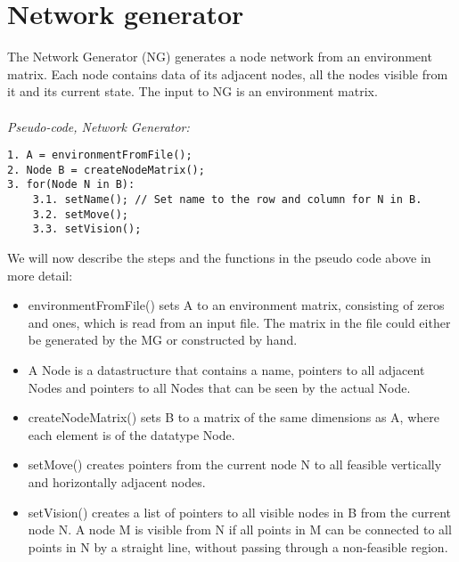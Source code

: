 \section{Network generator}
The Network Generator (NG) generates a node network from an environment matrix. Each node contains data of its adjacent nodes, all the nodes visible from it and its current state. The input to NG is an environment matrix.\\
\\
\noindent \emph{Pseudo-code, Network Generator:}
\begin{verbatim}
1. A = environmentFromFile();
2. Node B = createNodeMatrix();
3. for(Node N in B):
    3.1. setName(); // Set name to the row and column for N in B.
    3.2. setMove();
    3.3. setVision();
\end{verbatim}
We will now describe the steps and the functions in the pseudo code above in more detail:
\begin{itemize}
\item environmentFromFile() sets A to an environment matrix, consisting of zeros and ones, which is read from an input file. The matrix in the file could either be generated by the MG or constructed by hand.
\item A Node is a datastructure that contains a name, pointers to all adjacent Nodes and pointers to all Nodes that can be seen by the actual Node.
\item createNodeMatrix() sets B to a matrix of the same dimensions as A, where each element is of the datatype Node.
\item setMove() creates pointers from the current node N to all feasible vertically and horizontally adjacent nodes.
\item setVision() creates a list of pointers to all visible nodes in B from the current node N. A node M is visible from N if all points in M can be connected to all points in N by a straight line, without passing through a non-feasible region.

\end{itemize}